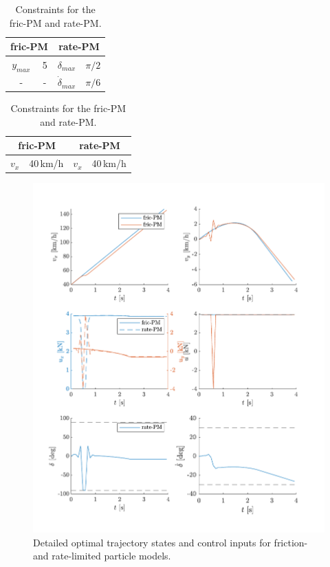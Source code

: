 \begin{table}[h]
    \centering
    \begin{subtable}[h]{0.4\textwidth}
        \begin{tabular}{c|c||c|c}
            \multicolumn{2}{c||}{fric-PM} & \multicolumn{2}{c}{rate-PM}\\
            \hline
            $y_{max}$ & 5 & $\delta_{max}$ & $\pi/2$ \\
            - & - & $\dot\delta_{max}$ & $\pi/6$ 
        \end{tabular}
        \caption{Constraints.}
        \label{tab:const_p1a}
    \end{subtable}
    \begin{subtable}[h]{0.4\textwidth}
        \begin{tabular}{c|c||c|c}
            \multicolumn{2}{c||}{fric-PM} & \multicolumn{2}{c}{rate-PM}\\
            \hline
            $v_x$ & 40\,km/h & $v_x$ & 40\,km/h
        \end{tabular}
        \caption{Initial conditions.}
        \label{tab:const_p1a}
    \end{subtable}
    \caption{Constraints for the fric-PM and rate-PM.}
    \label{tab:const_p1}
\end{table}

\begin{figure}[h!]
    \includegraphics{figures/flp_avoid_detailed.pdf}
    \caption{Detailed optimal trajectory states and control inputs for friction- and rate-limited particle models.}
    \label{fig:prob1_res_detail}
\end{figure}

